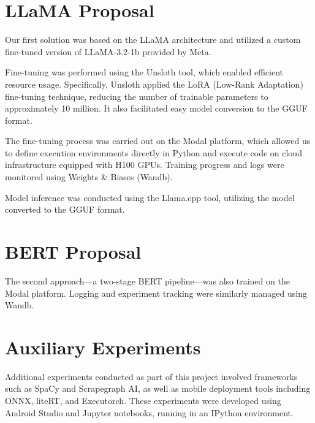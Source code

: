 \documentclass[licencjacka,en]{pracamgr}
\begin{document}
\section{LLaMA Proposal}

Our first solution was based on the LLaMA architecture and utilized a custom fine-tuned version of LLaMA-3.2-1b provided by Meta\cite{meta-llama}.

Fine-tuning was performed using the Unsloth\cite{unsloth} tool, which enabled efficient resource usage. Specifically, Unsloth applied the LoRA (Low-Rank Adaptation) fine-tuning technique\cite{hu2021loralowrankadaptationlarge}, reducing the number of trainable parameters to approximately 10 million. It also facilitated easy model conversion to the GGUF format.

The fine-tuning process was carried out on the Modal platform\cite{modal}, which allowed us to define execution environments directly in Python and execute code on cloud infrastructure equipped with H100 GPUs. Training progress and logs were monitored using Weights \& Biases (Wandb)\cite{wandb}.

Model inference was conducted using the Llama.cpp\cite{llama-cpp} tool, utilizing the model converted to the GGUF format.

\section{BERT Proposal}

The second approach—a two-stage BERT pipeline—was also trained on the Modal platform. Logging and experiment tracking were similarly managed using Wandb.

\section{Auxiliary Experiments}

Additional experiments conducted as part of this project involved frameworks such as SpaCy\cite{spacy}\cite{spacy-exp} and Scrapegraph AI\cite{scapegraph_repo}\cite{scrapegraph-exp}, as well as mobile deployment tools including ONNX\cite{onnx}\cite{onnx-exp}, liteRT\cite{lite-rt}\cite{lite-rt-exp}, and Executorch\cite{executorch}\cite{executorch-exp}. These experiments were developed using Android Studio\cite{android-studio}\cite{service_demo_app_repo} and Jupyter notebooks\cite{jupyter}, running in an IPython\cite{ipython} environment.
\end{document}
